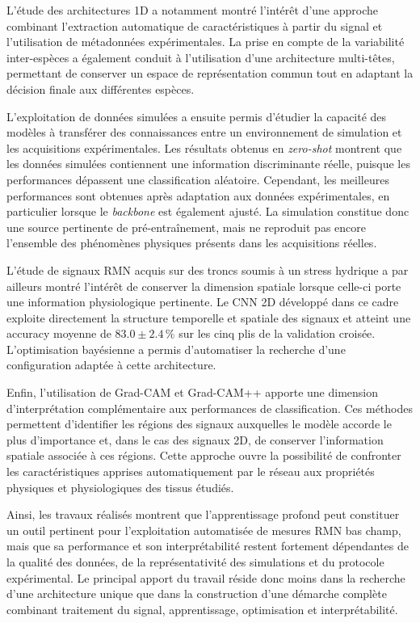 \documentclass[12pt,a4paper,twoside]{article}
\begin{document}
L'étude des architectures 1D a notamment montré l'intérêt d'une approche
combinant l'extraction automatique de caractéristiques à partir du signal et
l'utilisation de métadonnées expérimentales. La prise en compte de la
variabilité inter-espèces a également conduit à l'utilisation d'une architecture
multi-têtes, permettant de conserver un espace de représentation commun tout en
adaptant la décision finale aux différentes espèces.

L'exploitation de données simulées a ensuite permis d'étudier la capacité des
modèles à transférer des connaissances entre un environnement de simulation et
les acquisitions expérimentales. Les résultats obtenus en \textit{zero-shot}
montrent que les données simulées contiennent une information discriminante
réelle, puisque les performances dépassent une classification aléatoire.
Cependant, les meilleures performances sont obtenues après adaptation aux
données expérimentales, en particulier lorsque le \textit{backbone} est
également ajusté. La simulation constitue donc une source pertinente de
pré-entraînement, mais ne reproduit pas encore l'ensemble des phénomènes
physiques présents dans les acquisitions réelles.

L'étude de signaux RMN acquis sur des troncs soumis à un stress hydrique a par
ailleurs montré l'intérêt de conserver la dimension spatiale lorsque celle-ci
porte une information physiologique pertinente. Le CNN 2D développé dans ce
cadre exploite directement la structure temporelle et spatiale des signaux et
atteint une accuracy moyenne de $83.0 \pm 2.4\,\%$ sur les cinq plis de la
validation croisée. L'optimisation bayésienne a permis d'automatiser la
recherche d'une configuration adaptée à cette architecture.

Enfin, l'utilisation de Grad-CAM et Grad-CAM++ apporte une dimension
d'interprétation complémentaire aux performances de classification. Ces
méthodes permettent d'identifier les régions des signaux auxquelles le modèle
accorde le plus d'importance et, dans le cas des signaux 2D, de conserver
l'information spatiale associée à ces régions. Cette approche ouvre la
possibilité de confronter les caractéristiques apprises automatiquement par le
réseau aux propriétés physiques et physiologiques des tissus étudiés.

Ainsi, les travaux réalisés montrent que l'apprentissage profond peut constituer
un outil pertinent pour l'exploitation automatisée de mesures RMN bas champ,
mais que sa performance et son interprétabilité restent fortement dépendantes
de la qualité des données, de la représentativité des simulations et du
protocole expérimental. Le principal apport du travail réside donc moins dans
la recherche d'une architecture unique que dans la construction d'une démarche
complète combinant traitement du signal, apprentissage, optimisation et
interprétabilité.
\end{document}
